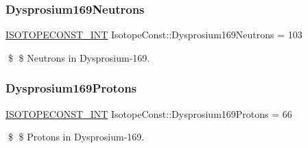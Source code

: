 \subsubsection{\texorpdfstring{Dysprosium169\+Neutrons}{Dysprosium169Neutrons}}
{\footnotesize\ttfamily \mbox{\hyperlink{group___isotope_const-_macros_ga5f18360b3e99483a35c32d789e62621c}{I\+S\+O\+T\+O\+P\+E\+C\+O\+N\+S\+T\+\_\+\+I\+NT}} Isotope\+Const\+::\+Dysprosium169\+Neutrons = 103}

\$ \$ Neutrons in Dysprosium-\/169. \mbox{\label{group___isotope_const-_dysprosium-_dy169_ga75f373f6f78e59dba1ba29961d4af159}} 
\subsubsection{\texorpdfstring{Dysprosium169\+Protons}{Dysprosium169Protons}}
{\footnotesize\ttfamily \mbox{\hyperlink{group___isotope_const-_macros_ga5f18360b3e99483a35c32d789e62621c}{I\+S\+O\+T\+O\+P\+E\+C\+O\+N\+S\+T\+\_\+\+I\+NT}} Isotope\+Const\+::\+Dysprosium169\+Protons = 66}

\$ \$ Protons in Dysprosium-\/169. 